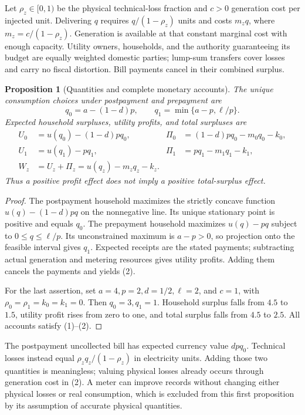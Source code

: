 \documentclass[11pt]{article}
\newtheorem{proposition}[theorem]{Proposition}
\theoremstyle{definition}
\begin{document}
Let $\rho_z\in[0,1)$ be the physical technical-loss fraction and $c>0$ generation cost per injected unit. Delivering $q$ requires $q/(1-\rho_z)$ units and costs $m_zq$, where $m_z=c/(1-\rho_z)$. Generation is available at that constant marginal cost with enough capacity. Utility owners, households, and the authority guaranteeing its budget are equally weighted domestic parties; lump-sum transfers cover losses and carry no fiscal distortion. Bill payments cancel in their combined surplus.

\begin{proposition}[Quantities and complete monetary accounts]
The unique consumption choices under postpayment and prepayment are
\[
 q_0=a-(1-d)p,\qquad q_1=\min\{a-p,\ell/p\}.
 \tag{1}
\]
Expected household surpluses, utility profits, and total surpluses are
\[
 \begin{aligned}
 U_0&=u(q_0)-(1-d)pq_0,&\Pi_0&=(1-d)pq_0-m_0q_0-k_0,\\
 U_1&=u(q_1)-pq_1,&\Pi_1&=pq_1-m_1q_1-k_1,\\
 W_z&=U_z+\Pi_z=u(q_z)-m_zq_z-k_z.&&
 \end{aligned}
 \tag{2}
\]
Thus a positive profit effect does not imply a positive total-surplus effect.
\end{proposition}
\begin{proof}
The postpayment household maximizes the strictly concave function $u(q)-(1-d)pq$ on the nonnegative line. Its unique stationary point is positive and equals $q_0$. The prepayment household maximizes $u(q)-pq$ subject to $0\leq q\leq\ell/p$. Its unconstrained maximum is $a-p>0$, so projection onto the feasible interval gives $q_1$. Expected receipts are the stated payments; subtracting actual generation and metering resources gives utility profits. Adding them cancels the payments and yields (2).

For the last assertion, set $a=4,p=2,d=1/2,\ell=2$, and $c=1$, with $\rho_0=\rho_1=k_0=k_1=0$. Then $q_0=3,q_1=1$. Household surplus falls from $4.5$ to $1.5$, utility profit rises from zero to one, and total surplus falls from $4.5$ to $2.5$. All accounts satisfy (1)--(2).
\end{proof}

The postpayment uncollected bill has expected currency value $dpq_0$. Technical losses instead equal $\rho_zq_z/(1-\rho_z)$ in electricity units. Adding those two quantities is meaningless; valuing physical losses already occurs through generation cost in (2). A meter can improve records without changing either physical losses or real consumption, which is excluded from this first proposition by its assumption of accurate physical quantities.
\end{document}
